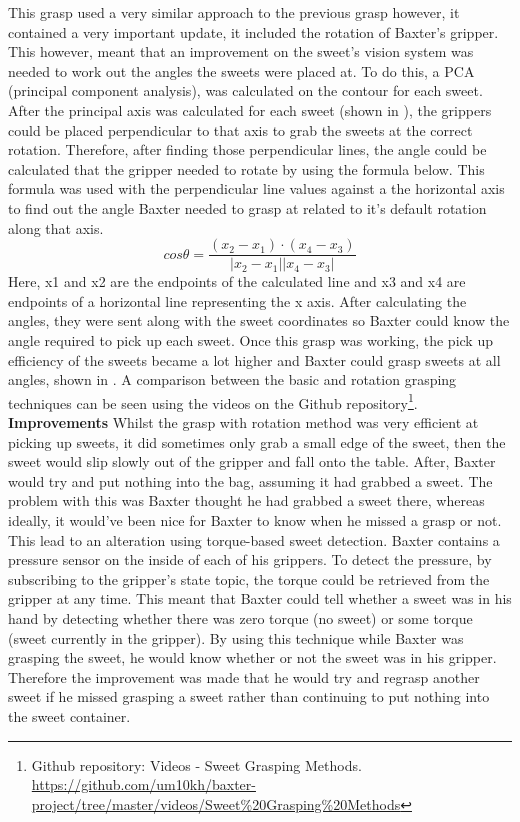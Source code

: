 This grasp used a very similar approach to the previous grasp however, it contained a very important update, it included the rotation of Baxter's gripper. This however, meant that an improvement on the sweet's vision system was needed to work out the angles the sweets were placed at. To do this, a PCA (principal component analysis), was calculated on the contour for each sweet. After the principal axis was calculated for each sweet (shown in \textbf{}), the grippers could be placed perpendicular to that axis to grab the sweets at the correct rotation. Therefore, after finding those perpendicular lines, the angle could be calculated that the gripper needed to rotate by using the formula below. This formula was used with the perpendicular line values against a the horizontal axis to find out the angle Baxter needed to grasp at related to it's default rotation along that axis.
\newline
\[
    cos\theta = \frac{(x_2 - x_1)\cdot(x_4 - x_3)}{|x_2 - x_1||x_4 - x_3|}
\]
\newline
Here, x1 and x2 are the endpoints of the calculated line and x3 and x4 are endpoints of a horizontal line representing the x axis. After calculating the angles, they were sent along with the sweet coordinates so Baxter could know the angle required to pick up each sweet. Once this grasp was working, the pick up efficiency of the sweets became a lot higher and Baxter could grasp sweets at all angles, shown in \textbf{}. A comparison between the basic and rotation grasping techniques can be seen using the videos on the Github repository\footnote{Github repository: Videos - Sweet Grasping Methods. \url{https://github.com/um10kh/baxter-project/tree/master/videos/Sweet\%20Grasping\%20Methods}}.
\newline\newline
\textbf{Improvements}\newline
Whilst the grasp with rotation method was very efficient at picking up sweets, it did sometimes only grab a small edge of the sweet, then the sweet would slip slowly out of the gripper and fall onto the table. After, Baxter would try and put nothing into the bag, assuming it had grabbed a sweet. The problem with this was Baxter thought he had grabbed a sweet there, whereas ideally, it would've been nice for Baxter to know when he missed a grasp or not. This lead to an alteration using torque-based sweet detection.
\newline\newline
Baxter contains a pressure sensor on the inside of each of his grippers. To detect the pressure, by subscribing to the gripper's state topic, the torque could be retrieved from the gripper at any time. This meant that Baxter could tell whether a sweet was in his hand by detecting whether there was zero torque (no sweet) or some torque (sweet currently in the gripper). By using this technique while Baxter was grasping the sweet, he would know whether or not the sweet was in his gripper. Therefore the improvement was made that he would try and regrasp another sweet if he missed grasping a sweet rather than continuing to put nothing into the sweet container.

